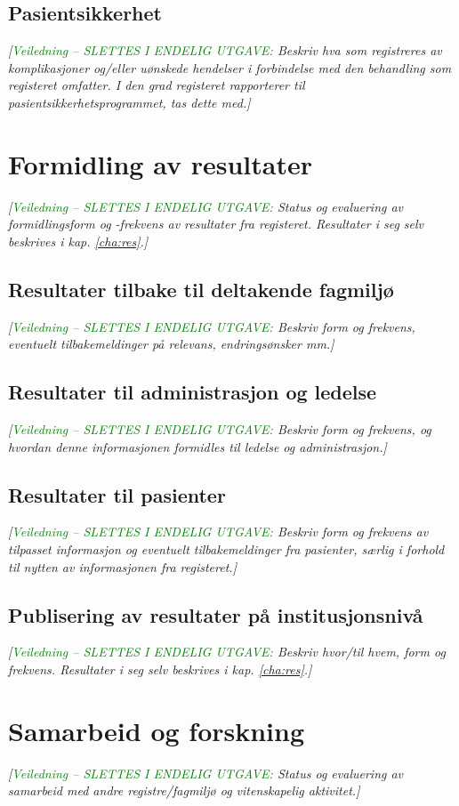 \documentclass[norsk, a4paper, twocolumn]{report}
\newcommand{\newtext}[1]{\cbstart\textcolor{green}{#1\cbend}}
\newcommand{\guide}[1] {
	\textit{[\textcolor{guidegray}{\newtext{Veiledning -- SLETTES I ENDELIG
	UTGAVE:} #1}]}
	}
\begin{document}
\section{Pasientsikkerhet}\label{sec:kom}
\guide{Beskriv hva som registreres av komplikasjoner og/eller uønskede
hendelser i forbindelse med den behandling som registeret omfatter. I den grad
registeret rapporterer til pasientsikkerhetsprogrammet, tas dette med.}




\chapter{Formidling av resultater}\label{cha:dat}
\guide{Status og evaluering av formidlingsform og -frekvens
av resultater fra registeret. Resultater i seg selv beskrives i kap.
\ref{cha:res}.}

\section{Resultater tilbake til deltakende fagmiljø}\label{sec:resfag}
\guide{Beskriv form og frekvens,  eventuelt tilbakemeldinger på relevans,
endringsønsker mm.}

\section{Resultater til administrasjon og ledelse}\label{sec:resled}
\guide{Beskriv form og frekvens, og hvordan denne
informasjonen formidles til ledelse og administrasjon.}

\section{Resultater til pasienter}\label{sec:respas}
\guide{Beskriv form og frekvens av tilpasset informasjon og eventuelt
tilbakemeldinger fra pasienter, særlig i forhold til nytten av informasjonen
fra registeret.}

\section{Publisering av resultater på institusjonsnivå}\label{sec:off}
\guide{Beskriv hvor/til hvem, form og frekvens. Resultater i seg selv beskrives i kap. \ref{cha:res}.}




\chapter{Samarbeid og forskning}\label{cha:for}
\guide{Status og evaluering av samarbeid med andre registre/fagmiljø og  vitenskapelig aktivitet.}
\end{document}
